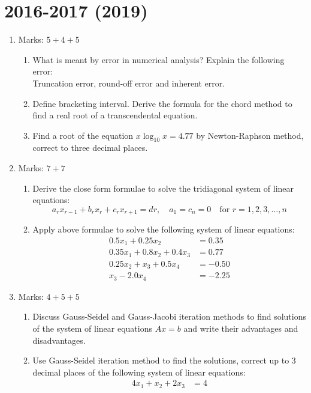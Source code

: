 \documentclass[12pt,class=book,crop=false]{standalone}
\begin{document}
\section*{2016-2017 (2019)}
\begin{enumerate}
    \item Marks: $ 5+4+5 $
    \begin{enumerate}
        \item What is meant by error in numerical analysis? Explain the following error:\\
        Truncation error, round-off error and inherent error.
        \item Define bracketing interval. Derive the formula for the chord method to find a real root of a transcendental equation.
        \item Find a root of the equation $ x \log_{10} x = 4.77 $ by Newton-Raphson method, correct to three decimal places.
    \end{enumerate}
    \item Marks: $ 7+7 $
    \begin{enumerate}
        \item Derive the close form formulae to solve the tridiagonal system of linear equations:
        \[
            a_r x_{r-1} + b_rx_r+ c_rx_{r +1} = dr,\quad a_1 = c_n = 0 \quad \text{for } r = 1,2, 3,\dots, n
        \]
        \item Apply above formulae to solve the following system of linear equations:
        \begin{align*}
            0.5x_1 +0.25x_2 &= 0.35\\
            0.35x_1 +0.8x_2 +0.4x_3 &= 0 . 77\\
            0. 25x_2 + x_3 + 0.5x_4 &= -0.50\\
            x_3 -2. 0x_4& = -2.25
        \end{align*}
    \end{enumerate}
    \item Marks: $ 4+5+5 $
    \begin{enumerate}
        \item Discuss Gauss-Seidel and Gauss-Jacobi iteration methods to find solutions of the system of linear equations $ Ax = b $ and write their advantages and disadvantages.
        \item Use Gauss-Seidel iteration method to find the solutions, correct up to 3 decimal places of the following system of linear equations:
        \begin{align*}
            4x_1 + x_2 + 2x_3 &= 4\\

\end{align*}
\end{enumerate}
\end{enumerate}
\end{document}
